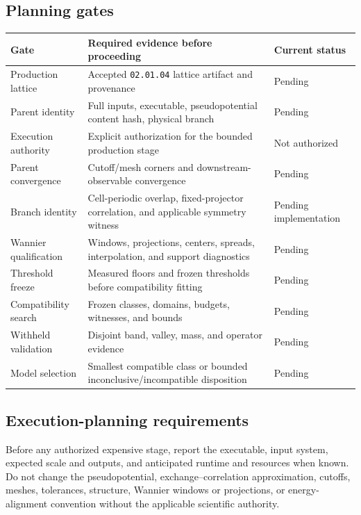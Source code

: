 \documentclass[11pt]{article}
\newenvironment{prospective}{\color{prospectivered}}{}
\begin{document}
\begin{prospective}
\subsection{Planning gates}
\begin{center}\small
\begin{tabularx}{\textwidth}{XXX}
\toprule
\textbf{Gate} & \textbf{Required evidence before proceeding} & \textbf{Current status} \\
\midrule
Production lattice & Accepted \texttt{02.01.04} lattice artifact and provenance & Pending \\
Parent identity & Full inputs, executable, pseudopotential content hash, physical branch & Pending \\
Execution authority & Explicit authorization for the bounded production stage & Not authorized \\
Parent convergence & Cutoff/mesh corners and downstream-observable convergence & Pending \\
Branch identity & Cell-periodic overlap, fixed-projector correlation, and applicable symmetry witness & Pending implementation \\
Wannier qualification & Windows, projections, centers, spreads, interpolation, and support diagnostics & Pending \\
Threshold freeze & Measured floors and frozen thresholds before compatibility fitting & Pending \\
Compatibility search & Frozen classes, domains, budgets, witnesses, and bounds & Pending \\
Withheld validation & Disjoint band, valley, mass, and operator evidence & Pending \\
Model selection & Smallest compatible class or bounded inconclusive/incompatible disposition & Pending \\
\bottomrule
\end{tabularx}
\end{center}
\subsection{Execution-planning requirements}
Before any authorized expensive stage, report the executable, input system, expected scale and outputs, and anticipated runtime and resources when known. Do not change the pseudopotential, exchange–correlation approximation, cutoffs, meshes, tolerances, structure, Wannier windows or projections, or energy-alignment convention without the applicable scientific authority.

\end{prospective}
\end{document}
